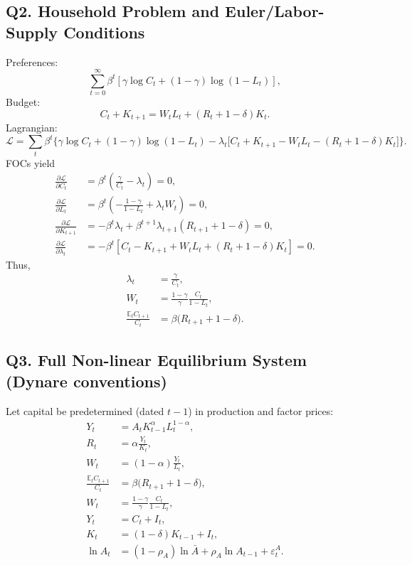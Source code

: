 \documentclass[a4paper,12pt]{article} %
\theoremstyle{nonitalic}
\begin{document}
\subsection*{Q2. Household Problem and Euler/Labor-Supply Conditions}
Preferences:
\begin{equation}
\sum_{t=0}^\infty \beta^t\left[ \gamma \log C_t + (1-\gamma)\log(1-L_t)\right],
\end{equation}
Budget:
\begin{equation}
C_t + K_{t+1} = W_t L_t + (R_t+1-\delta) K_t.
\end{equation}
Lagrangian:
\[
\mathcal{L}=\sum_t \beta^t\Big\{\gamma\log C_t+(1-\gamma)\log(1-L_t)-\lambda_t\big[C_t+K_{t+1}-W_tL_t-(R_t+1-\delta)K_t\big]\Big\}.
\]
FOCs yield
\begin{align}
\frac{\partial \mathcal{L}}{\partial C_t} &= \beta^t \left( \frac{\gamma}{C_t} - \lambda_t \right) = 0,\\
\frac{\partial \mathcal{L}}{\partial L_t} &= \beta^t \left( -\frac{1-\gamma}{1-L_t} + \lambda_t W_t \right) = 0,\\
\frac{\partial \mathcal{L}}{\partial K_{t+1}} &= - \beta^t \lambda_t + \beta^{t+1} \lambda_{t+1}(R_{t+1}+1-\delta) = 0, \\
\frac{\partial \mathcal{L}}{\partial \lambda_t} &= -\beta^t \left[C_t - K_{t+1} + W_t L_t + (R_t+1-\delta) K_t \right] = 0.
\end{align}
Thus,
\begin{align}
\lambda_t &= \frac{\gamma}{C_t},\\
W_t &= \frac{1-\gamma}{\gamma}\frac{C_t}{1-L_t},\\
\frac{\mathbb{E}_t C_{t+1}}{C_t} &= \beta\big(R_{t+1}+1-\delta\big).
\end{align}

\subsection*{Q3. Full Non-linear Equilibrium System (Dynare conventions)}
Let capital be predetermined (dated $t-1$) in production and factor prices:
\begin{align}
Y_t &= A_t K_{t-1}^{\alpha} L_t^{1-\alpha},\\
R_t &= \alpha \frac{Y_t}{K_{t}},\\
W_t &= (1-\alpha)\frac{Y_t}{L_t},\\
\frac{\mathbb{E}_t C_{t+1}}{C_t} &= \beta \big(R_{t+1}+1-\delta\big),\\
W_t &= \frac{1-\gamma}{\gamma}\frac{C_t}{1-L_t},\\
Y_t &= C_t + I_t,\\
K_t &= (1-\delta)K_{t-1}+I_t,\\
\ln A_t &= (1- \rho_A) \ln \bar A + \rho_A \ln A_{t-1} + \varepsilon^A_t.
\end{align}
\end{document}
